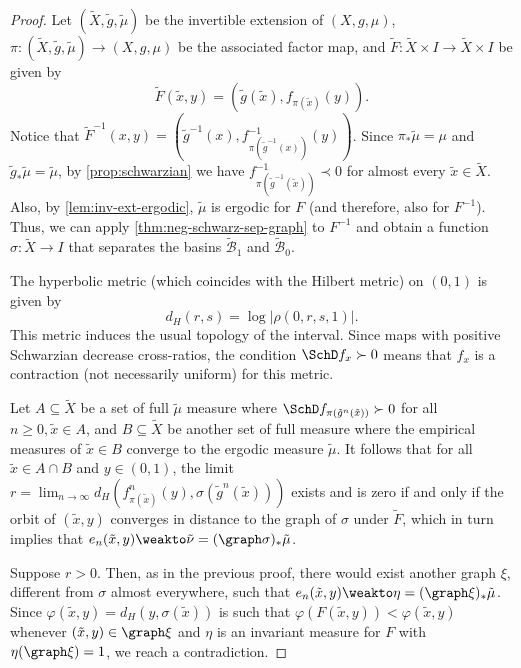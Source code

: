 \documentclass[../main]{subfiles}
\begin{document}
\begin{proof}
  \newcommand{\ex}{\tilde x}
  \newcommand{\eX}{\tilde X}
  \newcommand{\emu}{\tilde \mu}
  \newcommand{\enu}{\tilde \nu}
  \newcommand{\eg}{\tilde g}
  \newcommand{\eF}{\tilde F}
  \newcommand{\ef}{\tilde f}
  \newcommand{\eAu}{\tilde\mathcal{A}_1}
  \newcommand{\eAl}{\tilde\mathcal{A}_0}
  \newcommand{\eBu}{\tilde{\mathcal{B}}_1}
  \newcommand{\eBl}{\tilde{\mathcal{B}}_0}

  Let \((\eX, \eg, \emu)\) be the invertible extension of \((X, g, \mu)\), \(\pi \colon (\eX, \eg, \emu) \to (X, g, \mu)\) be the associated factor map, and \(\eF \colon \eX \times I \to \eX \times I\) be given by
  \begin{equation*}
    \eF(\ex, y) = (\eg(\ex), f_{\pi(\ex)}(y)).
  \end{equation*}
  Notice that \(\eF^{-1}(x, y) = (\eg^{-1}(x), f_{\pi(\eg^{-1}(x))}^{-1}(y))\). Since \(\pi_* \emu = \mu\) and \(\eg_* \emu = \emu\), by \cref{prop:schwarzian} we have \(f_{\pi(\eg^{-1}(\ex))}^{-1} \prec 0\) for almost every \(\ex \in \eX\). Also, by \cref{lem:inv-ext-ergodic}, \(\tilde{\mu}\) is ergodic for \(F\) (and therefore, also for \(F ^{-1}\)). Thus, we can apply \cref{thm:neg-schwarz-sep-graph} to \(F^{-1}\) and obtain a function \(\sigma \colon \eX \to I\) that separates the basins \(\eBu\) and \(\eBl\).

  The hyperbolic metric (which coincides with the Hilbert metric) on \((0, 1)\) is given by
  \[d_H(r, s) = \log \lvert \rho(0, r, s, 1) \rvert.\]
  This metric induces the usual topology of the interval.
  Since maps with positive Schwarzian decrease cross-ratios, the condition \(\SchD f_x \succ 0\) means that \(f_x\) is a contraction (not necessarily uniform) for this metric.

  Let \(A \subseteq \eX\) be a set of full \(\emu\) measure where \(\SchD f_{\pi(\eg^n(\ex))} \succ 0\) for all \(n \geq 0, \ex \in A\), and \(B \subseteq \eX\) be another set of full measure where the empirical measures of \(\ex \in B\) converge to the ergodic measure \(\emu\). It follows that for all \(\ex \in A \cap B\) and \(y \in (0, 1)\), the limit \(r = \lim_{n \to \infty} d_H(f_{\pi(\ex)}^n(y), \sigma(\eg^n(\ex)))\) exists and is zero if and only if the orbit of \((\ex, y)\) converges in distance to the graph of \(\sigma\) under \(\eF\), which in turn implies that \(e_n(\ex, y) \weakto \enu = (\graph \sigma)_* \emu\).

  Suppose \(r > 0\). Then, as in the previous proof, there would exist another graph \(\xi\), different from \(\sigma\) almost everywhere, such that \(e_n(\ex, y) \weakto \eta = (\graph \xi)_* \emu\). Since \(\varphi(\ex, y) = d_H(y, \sigma(\ex))\) is such that \(\varphi(F(\ex, y)) < \varphi(\ex, y)\) whenever \((\ex, y) \in \graph \xi\) and \(\eta\) is an invariant measure for \(F\) with \(\eta(\graph \xi) = 1\), we reach a contradiction.


\end{proof}
\end{document}
